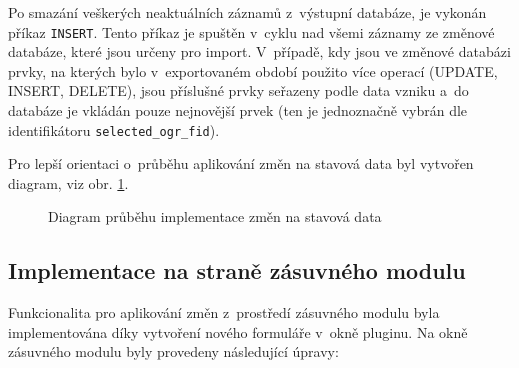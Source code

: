 \documentclass[a4paper,12pt,oneside]{book}
\begin{document}
Po smazání veškerých neaktuálních záznamů z~výstupní databáze, je
vykonán příkaz \texttt{INSERT}. Tento příkaz je spuštěn v~cyklu nad
všemi záznamy ze změnové databáze, které jsou určeny pro
import. V~případě, kdy jsou ve změnové databázi prvky, na kterých bylo
v~exportovaném období použito více operací (UPDATE, INSERT, DELETE),
jsou příslušné prvky seřazeny podle data vzniku a~do databáze je
vkládán pouze nejnovější prvek (ten je jednoznačně vybrán dle
identifikátoru \texttt{selected\_ogr\_fid}).

Pro lepší orientaci o~průběhu aplikování změn na stavová data byl
vytvořen diagram, viz obr. \ref{l_zmeny_diagram}.

\begin{figure}
  \centering
  
  \caption{Diagram průběhu implementace změn na stavová data}
  \label{l_zmeny_diagram}
\end{figure}


\newpage
\subsection{Implementace na straně zásuvného modulu}
\label{l_implementace_zmen}
Funkcionalita pro aplikování změn z~prostředí zásuvného modulu byla
implementována díky vytvoření nového formuláře v~okně pluginu. Na okně
zásuvného modulu byly provedeny následující úpravy:
\end{document}
